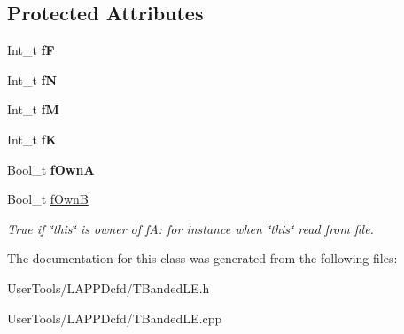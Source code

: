 \subsection*{Protected Attributes}
\begin{DoxyCompactItemize}
\item 
\hypertarget{classTBandedLE_afa73413ba63317a868c812df85841a4e}{
Int\_\-t {\bfseries fF}}
\label{classTBandedLE_afa73413ba63317a868c812df85841a4e}

\item 
\hypertarget{classTBandedLE_a76a6c05a5fe84896598cfe33ce77c949}{
Int\_\-t {\bfseries fN}}
\label{classTBandedLE_a76a6c05a5fe84896598cfe33ce77c949}

\item 
\hypertarget{classTBandedLE_afa5e70a3e99ae956dfba9b0111ca800e}{
Int\_\-t {\bfseries fM}}
\label{classTBandedLE_afa5e70a3e99ae956dfba9b0111ca800e}

\item 
\hypertarget{classTBandedLE_a30e79aaa49cecea99aa050c9557f5be2}{
Int\_\-t {\bfseries fK}}
\label{classTBandedLE_a30e79aaa49cecea99aa050c9557f5be2}

\item 
\hypertarget{classTBandedLE_a69db48fd34971c7255eb9861c5294211}{
Bool\_\-t {\bfseries fOwnA}}
\label{classTBandedLE_a69db48fd34971c7255eb9861c5294211}

\item 
\hypertarget{classTBandedLE_a3b636066f321209c7e223d221679915a}{
Bool\_\-t \hyperlink{classTBandedLE_a3b636066f321209c7e223d221679915a}{fOwnB}}
\label{classTBandedLE_a3b636066f321209c7e223d221679915a}

\begin{DoxyCompactList}\small\item\em True if \char`\"{}this\char`\"{} is owner of fA: for instance when \char`\"{}this\char`\"{} read from file. \item\end{DoxyCompactList}\end{DoxyCompactItemize}


The documentation for this class was generated from the following files:\begin{DoxyCompactItemize}
\item 
UserTools/LAPPDcfd/TBandedLE.h\item 
UserTools/LAPPDcfd/TBandedLE.cpp\end{DoxyCompactItemize}
